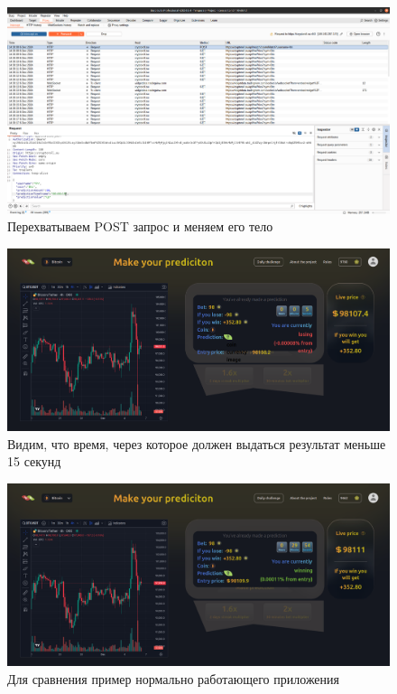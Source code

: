 \documentclass[a4paper, 12pt]{article}
\begin{document}
\begin{figure}[h!]
    \noindent
    \centering
    \includegraphics[width=1\linewidth]{pic_burp_2.png}
    \caption{Перехватываем POST запрос и меняем его тело}
\end{figure}

\newpage
\begin{figure}[h!]
    \noindent
    \centering
    \includegraphics[width=1\linewidth]{pic_cryptoroll_3.png}
    \caption{Видим, что время, через которое должен выдаться результат меньше 15 секунд}
\end{figure}

\begin{figure}[h!]
    \noindent
    \centering
    \includegraphics[width=1\linewidth]{pic_cryptoroll_4.png}
    \caption{Для сравнения пример нормально работающего приложения}
\end{figure}
\end{document}
